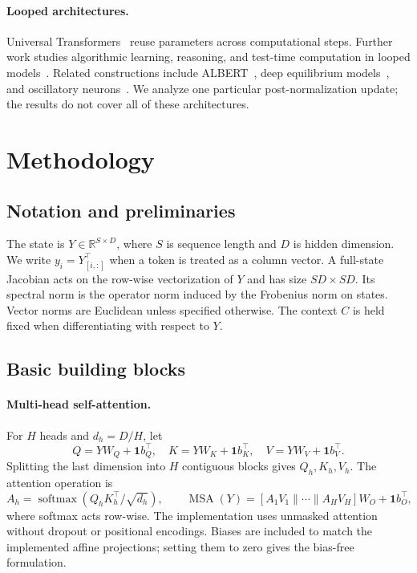 \documentclass[11pt]{article}
\newcommand{\R}{\mathbb{R}}
\newcommand{\MSA}{\operatorname{MSA}}
\numberwithin{equation}{section}
\begin{document}
\paragraph{Looped architectures.}
Universal Transformers~\cite{dehghani2019universal} reuse parameters across
computational steps. Further work studies algorithmic learning, reasoning, and
test-time computation in looped
models~\cite{yang2024looped,giannou2023programmable,saunshi2025reasoning,
geiping2025scaling,bansal2022algorithm}.
Related constructions include ALBERT~\cite{lan2020albert}, deep equilibrium
models~\cite{bai2019equilibrium}, and oscillatory
neurons~\cite{miyato2025kuramoto}. We analyze one particular post-normalization
update; the results do not cover all of these architectures.

\section{Methodology}
\subsection{Notation and preliminaries}
The state is $Y\in\R^{S\times D}$, where $S$ is sequence length and $D$ is hidden
dimension. We write $y_i=Y_{[i,:]}^\top$ when a token is treated as a column
vector. A full-state Jacobian acts on the row-wise vectorization of $Y$ and has
size $SD\times SD$. Its spectral norm is the operator norm induced by the
Frobenius norm on states. Vector norms are Euclidean unless specified otherwise.
The context $C$ is held fixed when differentiating with respect to $Y$.

\subsection{Basic building blocks}
\paragraph{Multi-head self-attention.}
For $H$ heads and $d_h=D/H$, let
\begin{equation}
Q=YW_Q+\mathbf{1}b_Q^\top,\quad
K=YW_K+\mathbf{1}b_K^\top,\quad
V=YW_V+\mathbf{1}b_V^\top.
\end{equation}
Splitting the last dimension into $H$ contiguous blocks gives $Q_h,K_h,V_h$.
The attention operation is
\begin{equation}
A_h=\operatorname{softmax}\!\left(Q_hK_h^\top/\sqrt{d_h}\right),\qquad
\MSA(Y)=[A_1V_1\|\cdots\|A_HV_H]W_O+\mathbf{1}b_O^\top,
\end{equation}
where softmax acts row-wise. The implementation uses unmasked attention without
dropout or positional encodings. Biases are included to match the implemented
affine projections; setting them to zero gives the bias-free formulation.
\end{document}
